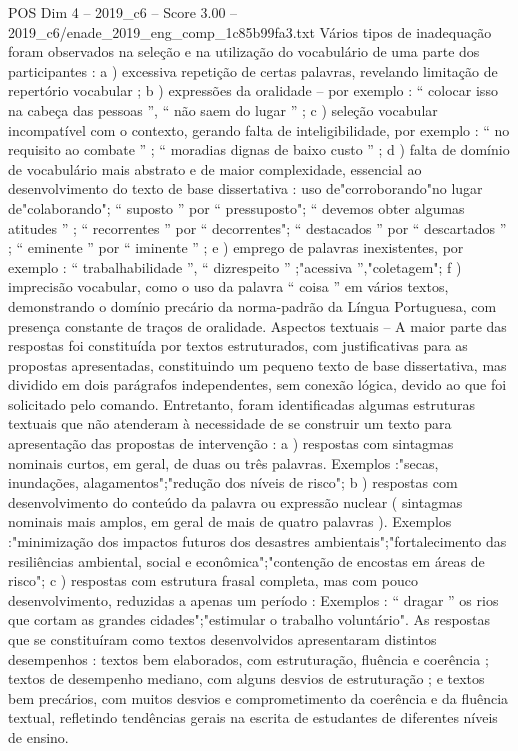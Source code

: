 \begin{textsample}{POS Dim 4 – 2019\_c6 – Score 3.00 – 2019\_c6/enade\_2019\_eng\_comp\_1c85b99fa3.txt}
Vários tipos de inadequação foram observados na seleção e na utilização do vocabulário de uma parte dos participantes : a ) excessiva repetição de certas palavras, revelando limitação de repertório vocabular ; b ) expressões da oralidade – por exemplo : “ colocar isso na cabeça das pessoas ”, “ não saem do lugar ” ; c ) seleção vocabular incompatível com o contexto, gerando falta de inteligibilidade, por exemplo : “ no requisito ao combate ” ; “ moradias dignas de baixo custo ” ; d ) falta de domínio de vocabulário mais abstrato e de maior complexidade, essencial ao desenvolvimento do texto de base dissertativa : uso de"corroborando"no lugar de"colaborando"; “ suposto ” por “ pressuposto"; “ devemos obter algumas atitudes ” ; “ recorrentes ” por “ decorrentes"; “ destacados ” por “ descartados ” ; “ eminente ” por “ iminente ” ; e ) emprego de palavras inexistentes, por exemplo : “ trabalhabilidade ”, “ dizrespeito ” ;"acessiva ”,"coletagem"; f ) imprecisão vocabular, como o uso da palavra “ coisa ” em vários textos, demonstrando o domínio precário da norma-padrão da Língua Portuguesa, com presença constante de traços de oralidade.
Aspectos textuais – A maior parte das respostas foi constituída por textos estruturados, com justificativas para as propostas apresentadas, constituindo um pequeno texto de base dissertativa, mas dividido em dois parágrafos independentes, sem conexão lógica, devido ao que foi solicitado pelo comando.
Entretanto, foram identificadas algumas estruturas textuais que não atenderam à necessidade de se construir um texto para apresentação das propostas de intervenção : a ) respostas com sintagmas nominais curtos, em geral, de duas ou três palavras.
Exemplos :"secas, inundações, alagamentos";"redução dos níveis de risco"; b ) respostas com desenvolvimento do conteúdo da palavra ou expressão nuclear ( sintagmas nominais mais amplos, em geral de mais de quatro palavras ).
Exemplos :"minimização dos impactos futuros dos desastres ambientais";"fortalecimento das resiliências ambiental, social e econômica";"contenção de encostas em áreas de risco"; c ) respostas com estrutura frasal completa, mas com pouco desenvolvimento, reduzidas a apenas um período : Exemplos : “ dragar ” os rios que cortam as grandes cidades";"estimular o trabalho voluntário".
As respostas que se constituíram como textos desenvolvidos apresentaram distintos desempenhos : textos bem elaborados, com estruturação, fluência e coerência ; textos de desempenho mediano, com alguns desvios de estruturação ; e textos bem precários, com muitos desvios e comprometimento da coerência e da fluência textual, refletindo tendências gerais na escrita de estudantes de diferentes níveis de ensino.

\end{textsample}
